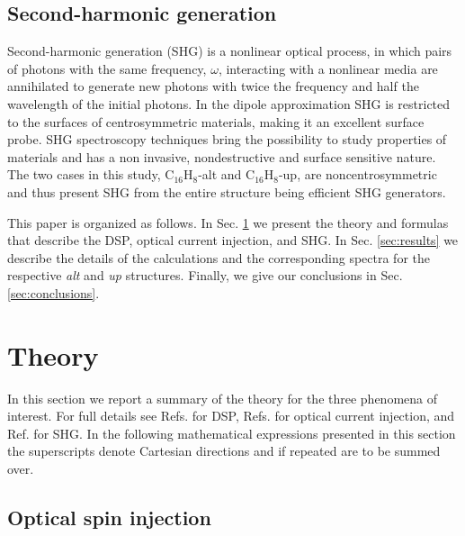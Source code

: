 \documentclass[pss]{wiley2sp} %
\begin{document}
\subsection{Second-harmonic generation}
Second-harmonic generation (SHG) is a nonlinear optical process, in which pairs of photons with the same frequency, $\omega$, interacting with a nonlinear media are annihilated to generate new photons with twice the frequency and half the wavelength of the initial photons.
In the dipole approximation SHG is restricted to the surfaces of
centrosymmetric materials, making it an excellent surface probe. SHG
spectroscopy techniques bring the possibility to study properties of materials
and has a non invasive, nondestructive and surface sensitive nature.
The two cases in this study,
C$_{16}$H$_{8}$-alt and C$_{16}$H$_{8}$-up, are noncentrosymmetric and thus
present SHG from the entire structure being efficient SHG generators.

This paper is organized as follows. In Sec. \ref{sec:theory} we present the
theory and formulas that describe the DSP, optical current injection, and SHG.
In Sec. \ref{sec:results} we describe the details of the calculations and the
corresponding spectra for the respective \emph{alt} and \emph{up} structures.
Finally, we give our conclusions in Sec. \ref{sec:conclusions}.


\section{Theory}\label{sec:theory}

In this section we report a summary of the theory for the three phenomena of
interest. For full details see Refs. \cite{nastosPRB07,mendozaPRB12} for DSP,
Refs. \cite{cabellosPRB11,sipePRB00} for optical current injection, and Ref.
\cite{andersonPRB15} for SHG. In the following mathematical expressions presented in this section the superscripts denote Cartesian directions and if repeated are to be summed over.


\subsection{Optical spin injection}\label{sec:theory-DSP}
\end{document}
